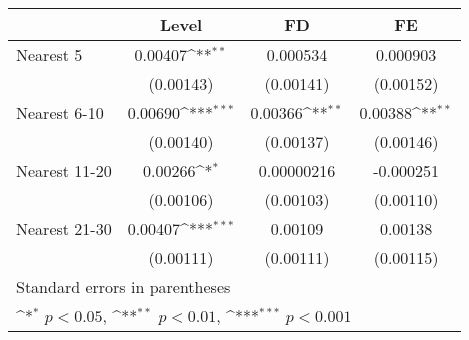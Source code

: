 {
\def\sym#1{\ifmmode^{#1}\else\(^{#1}\)\fi}
\begin{tabular}{l*{3}{c}}
\hline\hline
            &\multicolumn{1}{c}{Level}&\multicolumn{1}{c}{FD}&\multicolumn{1}{c}{FE}\\
\hline
Nearest 5   &     0.00407\sym{**} &    0.000534         &    0.000903         \\
            &   (0.00143)         &   (0.00141)         &   (0.00152)         \\
[1em]
Nearest 6-10&     0.00690\sym{***}&     0.00366\sym{**} &     0.00388\sym{**} \\
            &   (0.00140)         &   (0.00137)         &   (0.00146)         \\
[1em]
Nearest 11-20&     0.00266\sym{*}  &  0.00000216         &   -0.000251         \\
            &   (0.00106)         &   (0.00103)         &   (0.00110)         \\
[1em]
Nearest 21-30&     0.00407\sym{***}&     0.00109         &     0.00138         \\
            &   (0.00111)         &   (0.00111)         &   (0.00115)         \\
\hline\hline
\multicolumn{4}{l}{\footnotesize Standard errors in parentheses}\\
\multicolumn{4}{l}{\footnotesize \sym{*} \(p<0.05\), \sym{**} \(p<0.01\), \sym{***} \(p<0.001\)}\\
\end{tabular}
}
